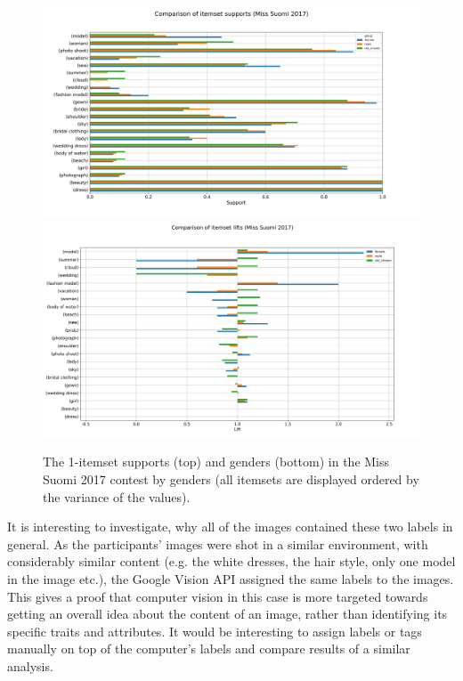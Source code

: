 \begin{figure}[]
    \begin{center}
        \includegraphics[width=1.0\textwidth]{Images/itemset_supports-gender-Miss_Helsinki-1_itemset.png}
        \includegraphics[width=1.0\textwidth]{Images/itemset_lifts-gender-Miss_Suomi-1_itemsets.png}
        \caption{The 1-itemset supports (top) and genders (bottom) in the Miss Suomi 2017 contest by genders (all itemsets are displayed ordered by the variance of the values).}
        \label{itemset_supports-gender-Miss_Helsinki-1_itemset}
    \end{center}
\end{figure}

It is interesting to investigate, why all of the images contained these two labels in general. As the participants' images were shot in a similar environment, with considerably similar content (e.g. the white dresses, the hair style, only one model in the image etc.), the Google Vision API assigned the same labels to the images. This gives a proof that computer vision in this case is more targeted towards getting an overall idea about the content of an image, rather than identifying its specific traits and attributes. It would be interesting to assign labels or tags manually on top of the computer's labels and compare results of a similar analysis.

